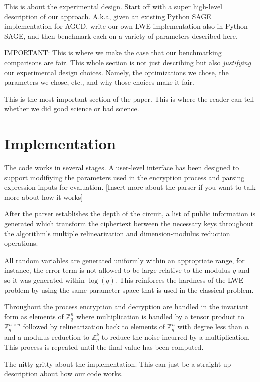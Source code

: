 \documentclass[letterpaper,twocolumn,10pt]{article}
\begin{document}
This is about the experimental design. Start off with a super high-level description of our approach. A.k.a, given an existing Python SAGE implementation for AGCD, write our own LWE implementation also in Python SAGE, and then benchmark each on a variety of parameters described here. 

IMPORTANT: This is where we make the case that our benchmarking comparisons are fair. This whole section is not just describing but also \emph{justifying} our experimental design choices. Namely, the optimizations we chose, the parameters we chose, etc., and why those choices make it fair. 

This is the most important section of the paper. This is where the reader can tell whether we did good science or bad science.


\section{Implementation}
The code works in several stages. A user-level interface has been designed to support modifiying the parameters used in the encryption process and parsing expression inputs for evaluation. [Insert more about the parser if you want to talk more about how it works]

After the parser establishes the depth of the circuit, a list of public information is generated which transform the ciphertext between the necessary keys throughout the algorithm's multiple relinearization and dimension-modulus reduction operations.

All random variables are generated uniformly within an appropriate range, for instance, the error term is not allowed to be large relative to the modulus $q$ and so it was generated within $\log(q)$. This reinforces the hardness of the LWE problem by using the same parameter space that is used in the classical problem.

Throughout the process encryption and decryption are handled in the invariant form as elements of $\mathbb{Z}^n_q$ where multiplication is handled by a tensor product to $\mathbb{Z}^{n\times n}_q$ followed by relinearization back to elements of $\mathbb{Z}^n_q$ with degree less than $n$ and a modulus reduction to $\mathbb{Z}^k_p$ to reduce the noise incurred by a multiplication. This process is repeated until the final value has been computed.

The nitty-gritty about the implementation. This can just be a straight-up description about how our code works.
\end{document}

